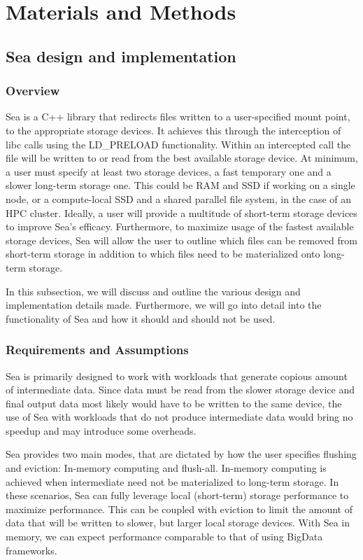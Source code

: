 \documentclass[10pt,journal,compsoc]{IEEEtran}
\begin{document}
\section{Materials and Methods}

\subsection{Sea design and implementation}
\subsubsection{Overview}

Sea is a C++ library that redirects files written to a user-specified mount point, to the
appropriate storage devices. It achieves this through the interception of libc calls using
the LD\_PRELOAD functionality. Within an intercepted call the file will be written to or read
from the best available storage device. At minimum, a user must specify at least two storage devices, a fast
temporary one and a slower long-term storage one. This could be RAM and SSD if working on a single node, or a compute-local SSD
and a shared parallel file system, in the case of an HPC cluster. Ideally, a user will provide a multitude of short-term storage
devices to improve Sea's efficacy. Furthermore, to maximize usage of the fastest available
storage devices, Sea will allow the user to outline which files can be removed from short-term storage in addition
to which files need to be materialized onto long-term storage.

In this subsection, we will discuss and outline the various design and implementation details made. Furthermore,
we will go into detail into the functionality of Sea and how it should and should not be used.

\subsubsection{Requirements and Assumptions}

Sea is primarily designed to work with workloads that generate copious amount of intermediate data.
Since data must be read from the slower storage device and final output data most likely would have to
be written to the same device, the use of Sea with workloads that do not produce intermediate data would
bring no speedup and may introduce some overheads. 

Sea provides two main modes, that are dictated by how the user specifies flushing and eviction: In-memory computing and flush-all.
In-memory computing is achieved when intermediate need not be materialized to long-term storage. In these scenarios, Sea can fully
leverage local (short-term) storage performance to maximize performance. This can be coupled with eviction to limit the amount of
data that will be written to slower, but larger local storage devices. With Sea in memory, we can expect performance comparable to
that of using BigData frameworks.
\end{document}
